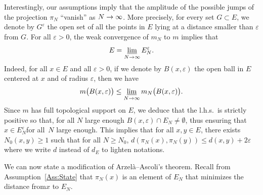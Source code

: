 \documentclass[AHL,Unicode,longabstracts]{cedram}
\theoremstyle{plain}
\renewcommand*{\to}{\mathchoice{\longrightarrow}{\rightarrow}{\rightarrow}{\rightarrow}}
\begin{document}
Interestingly, our assumptions imply that the amplitude of the possible jumps of the projection $\pi_N$ ``vanish'' as $N\to\infty$. More precisely, for every set $G\subset E$, we denote by $G^\varepsilon$ the open set of all the points in $E$ lying at a distance smaller than $\varepsilon$ from $G$. For all $\varepsilon > 0$, the weak convergence of $m_N$ to $m$ implies that
\begin{equation}\label{Cond:EN}
E = \varliminf_{N\to\infty} E_N^\varepsilon .
\end{equation}
Indeed, for all $x\in E$ and all $\varepsilon >0$, if we denote by $B(x,\varepsilon)$ the open ball in $E$ centered at $x$ and of radius $\varepsilon$, then we have
\begin{equation*}
m\big(B(x,\varepsilon)\big) \leq \varliminf_{N\to\infty} m_N\big(B(x,\varepsilon)\big).
\end{equation*}
Since $m$ has full topological support on $E$, we deduce that the l.h.s.~is strictly positive so that, for all $N$ large enough $B(x,\varepsilon)\cap E_N \ne \emptyset$, thus ensuring that $x\in E_N^\varepsilon$\linebreak for all~$N$ large enough. This implies that for all $x,y \in E$, there exists $N_0(x,y)\ge 1$ such that for all $N\ge N_0$, $d(\pi_N(x), \pi_N(y)) \le d(x, y) + 2\varepsilon$ where we write $d$ instead of $d_E$ to lighten notations.

We can now state a modification of Arzelà--Ascoli's theorem. Recall from Assumption~\ref{Ass:State} that $\pi_N(x)$ is an element of $E_N$ that minimizes the distance from\linebreak $x$ to $E_N$.
\end{document}
